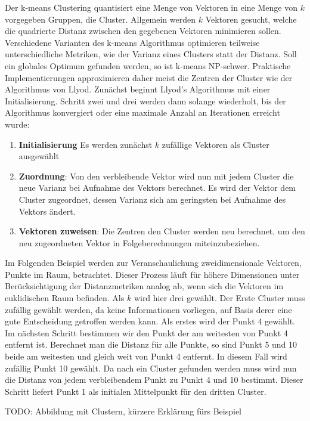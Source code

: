 Der k-means Clustering quantisiert eine Menge von Vektoren in eine Menge von $k$ vorgegeben Gruppen, die Cluster. Allgemein werden $k$ Vektoren gesucht, welche die quadrierte Distanz zwischen den gegebenen Vektoren minimieren sollen. Verschiedene Varianten des k-means Algorithmus optimieren teilweise unterschiedliche Metriken, wie der Varianz eines Clusters statt der Distanz. Soll ein globales Optimum gefunden werden, so ist k-means NP-schwer. Praktische Implementierungen approximieren daher meist die Zentren der Cluster wie der Algorithmus von Llyod. Zunächst beginnt Llyod's Algorithmus mit einer Initialisierung. Schritt zwei und drei werden dann solange wiederholt, bis der Algorithmus konvergiert oder eine maximale Anzahl an Iterationen erreicht wurde: 

\begin{enumerate}
	\item \textbf{Initialisierung} Es werden zunächst $k$ zufällige Vektoren als Cluster ausgewählt
	\item \textbf{Zuordnung}: Von den verbleibende Vektor wird nun mit jedem Cluster die neue Varianz bei Aufnahme des Vektors berechnet. Es wird der Vektor dem Cluster zugeordnet, dessen Varianz sich am geringsten bei Aufnahme des Vektors ändert.
	\item \textbf{Vektoren zuweisen}: Die Zentren den Cluster werden neu berechnet, um den neu zugeordneten Vektor in Folgeberechnungen miteinzubeziehen.
\end{enumerate}

Im Folgenden Beispiel werden zur Veranschaulichung zweidimensionale Vektoren, Punkte im Raum, betrachtet. Dieser Prozess läuft für höhere Dimensionen unter Berücksichtigung der Distanzmetriken analog ab, wenn sich die Vektoren im euklidischen Raum befinden. Als $k$ wird hier drei gewählt. Der Erste Cluster muss zufällig gewählt werden, da keine Informationen vorliegen, auf Basis derer eine gute Entscheidung getroffen werden kann. Als erstes wird der Punkt 4 gewählt. Im nächsten Schritt bestimmen wir den Punkt der am weitesten von Punkt 4 entfernt ist. Berechnet man die Distanz für alle Punkte, so sind Punkt 5 und 10 beide am weitesten und gleich weit von Punkt 4 entfernt. In diesem Fall wird zufällig Punkt 10 gewählt. Da nach ein Cluster gefunden werden muss wird nun die Distanz von jedem verbleibendem Punkt zu Punkt 4 und 10 bestimmt. Dieser Schritt liefert Punkt 1 als initialen Mittelpunkt für den dritten Cluster. \cite{mmd2011}

TODO: Abbildung mit Clustern, kürzere Erklärung fürs Beispiel

